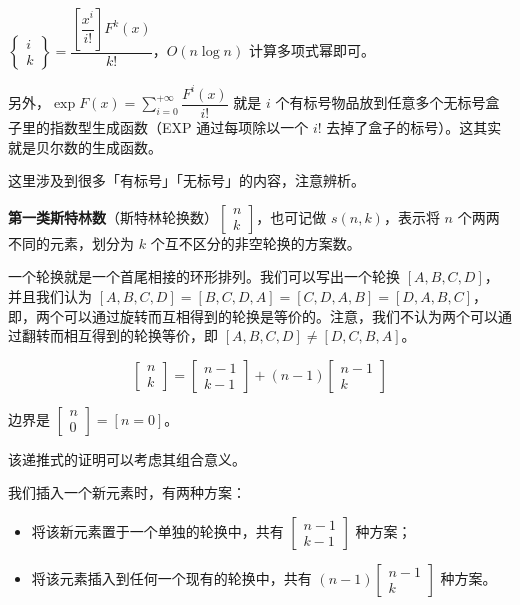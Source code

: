 $\begin{Bmatrix}i\\k\end{Bmatrix}=\dfrac{\left[\dfrac{x^i}{i!}\right]F^k(x)}{k!}$，$O(n\log n)$ 计算多项式幂即可。

另外，$\exp F(x)=\sum\limits_{i=0}^{+\infty}\dfrac{F^i(x)}{i!}$ 就是 $i$ 个有标号物品放到任意多个无标号盒子里的指数型生成函数（EXP 通过每项除以一个 $i!$ 去掉了盒子的标号）。这其实就是贝尔数的生成函数。

这里涉及到很多「有标号」「无标号」的内容，注意辨析。


\textbf{第一类斯特林数}（斯特林轮换数）$\begin{bmatrix}n\\ k\end{bmatrix}$，也可记做 $s(n,k)$，表示将 $n$ 个两两不同的元素，划分为 $k$ 个互不区分的非空轮换的方案数。

一个轮换就是一个首尾相接的环形排列。我们可以写出一个轮换 $[A,B,C,D]$，并且我们认为 $[A,B,C,D]=[B,C,D,A]=[C,D,A,B]=[D,A,B,C]$，即，两个可以通过旋转而互相得到的轮换是等价的。注意，我们不认为两个可以通过翻转而相互得到的轮换等价，即 $[A,B,C,D]\neq[D,C,B,A]$。


$$
\begin{bmatrix}n\\ k\end{bmatrix}=\begin{bmatrix}n-1\\ k-1\end{bmatrix}+(n-1)\begin{bmatrix}n-1\\ k\end{bmatrix}
$$

边界是 $\begin{bmatrix}n\\ 0\end{bmatrix}=[n=0]$。

该递推式的证明可以考虑其组合意义。

我们插入一个新元素时，有两种方案：

\begin{itemize}
    \item 将该新元素置于一个单独的轮换中，共有 $\begin{bmatrix}n-1\\ k-1\end{bmatrix}$ 种方案；
    \item 将该元素插入到任何一个现有的轮换中，共有 $(n-1)\begin{bmatrix}n-1\\ k\end{bmatrix}$ 种方案。
\end{itemize}

